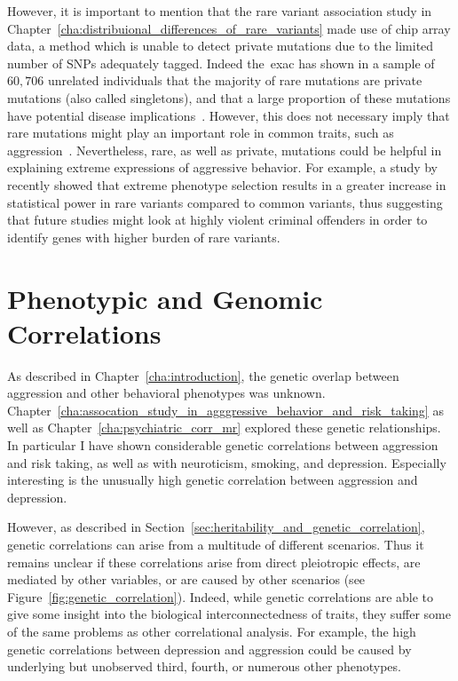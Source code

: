 However, it is important to mention that the rare variant association study in Chapter~\ref{cha:distribuional_differences_of_rare_variants} made use of chip array data, a method which is unable to detect private mutations due to the limited number of SNPs adequately tagged.
Indeed the~\acrfull{exac} has shown in a sample of $60,706$ unrelated individuals that the majority of rare mutations are private mutations (also called singletons), and that a large proportion of these mutations have potential disease implications~\cite{Lek2016,Kobayashi2017}.
However, this does not necessary imply that rare mutations might play an important role in common traits, such as aggression~\cite{Chabris2015}.
Nevertheless, rare, as well as private, mutations could be helpful in explaining extreme expressions of aggressive behavior.
For example, a study by~\cite{Peloso2016} recently showed that extreme phenotype selection results in a greater increase in statistical power in rare variants compared to common variants,
thus suggesting that future studies might look at highly violent criminal offenders in order to identify genes with higher burden of rare variants.

\section{Phenotypic and Genomic Correlations}
\label{sec:phenotypical_and_genomic_correlations}

As described in Chapter~\ref{cha:introduction}, the genetic overlap between aggression and other behavioral phenotypes was unknown.
Chapter~\ref{cha:assocation_study_in_agggressive_behavior_and_risk_taking} as well as Chapter~\ref{cha:psychiatric_corr_mr} explored these genetic relationships.
In particular I have shown considerable genetic correlations between aggression and risk taking, as well as with neuroticism, smoking, and depression. 
Especially interesting is the unusually high genetic correlation between aggression and depression.

However, as described in Section~\ref{sec:heritability_and_genetic_correlation}, genetic correlations can arise from a multitude of different scenarios.
Thus it remains unclear if these correlations arise from direct pleiotropic effects, are mediated by other variables, or are caused by other scenarios (see Figure~\ref{fig:genetic_correlation}). 
Indeed, while genetic correlations are able to give some insight into the biological interconnectedness of traits, they suffer some of the same problems as other correlational analysis. 
For example, the high genetic correlations between depression and aggression could be caused by underlying but unobserved third, fourth, or numerous other phenotypes.

